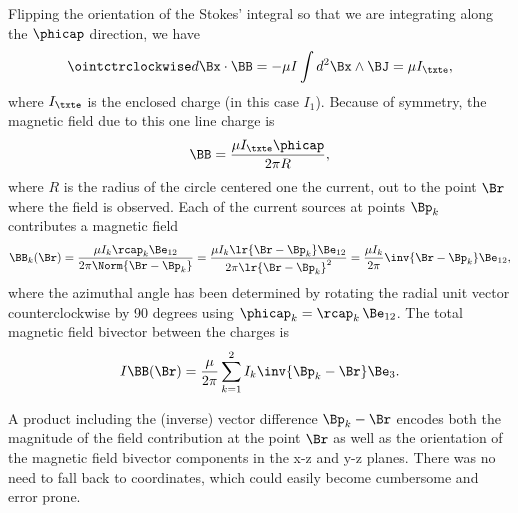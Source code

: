 Flipping the orientation of the Stokes' integral so that we are integrating along the \( \phicap \) direction, we have
\begin{dmath}\label{eqn:amperesLawMagnetostaticsExample:40}
\ointctrclockwise d\Bx \cdot \BB
= -\mu I \int d^2 \Bx \wedge \BJ
= \mu I_\txte,
\end{dmath}
where \( I_\txte \) is the enclosed charge (in this case \( I_1 \)).
Because of symmetry, the magnetic field due to this one line charge is
\begin{dmath}\label{eqn:amperesLawMagnetostaticsExample:60}
\BB
= \frac{\mu I_\txte \phicap}{2 \pi R},
\end{dmath}
where \( R \) is the radius of the circle centered one the current, out to the point \( \Br \) where the field is observed.
Each of the current sources at points \( \Bp_k \) contributes a magnetic field
\begin{dmath}\label{eqn:amperesLawMagnetostaticsExample:80}
\BB_k(\Br)
= \frac{\mu I_k \rcap_k \Be_{12} }{2 \pi \Norm{ \Br - \Bp_k} }
= \frac{\mu I_k \lr{ \Br - \Bp_k} \Be_{12} }{2 \pi \lr{ \Br - \Bp_k}^2 }
= \frac{\mu I_k}{2\pi} \inv{ \Br - \Bp_k} \Be_{12},
\end{dmath}
where the azimuthal angle has been determined by rotating the radial unit vector counterclockwise by 90 degrees using \( \phicap_k = \rcap_k\, \Be_{12} \).
The total magnetic field bivector between the charges is
\begin{equation}\label{eqn:amperesLawMagnetostaticsExample:100}
I \BB(\Br)
= \frac{\mu}{2\pi} \sum_{k = 1}^2 I_k \inv{\Bp_k - \Br } \Be_3.
\end{equation}

A product including the (inverse) vector difference \( \Bp_k - \Br \) encodes both the magnitude of the field contribution at the point \( \Br \) as well as the orientation of the magnetic field bivector components in the x-z and y-z planes.
There was no need to fall back to coordinates, which could easily become cumbersome and error prone.
